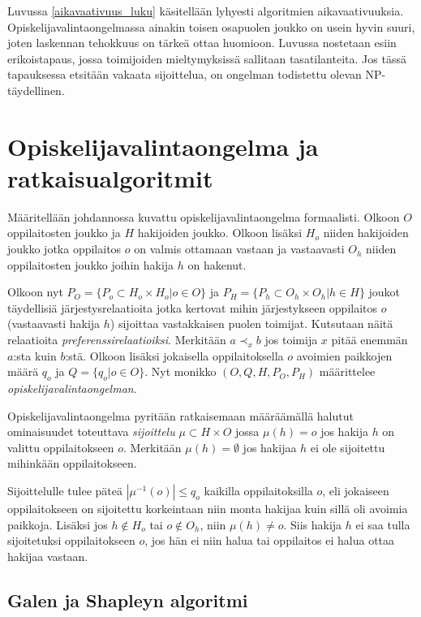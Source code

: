 \documentclass[gradu, twoside]{tktltiki}
\begin{document}
Luvussa \ref{aikavaativuus_luku} käsitellään lyhyesti algoritmien
aikavaativuuksia. Opiskelijavalintaongelmassa ainakin toisen osapuolen
joukko on usein hyvin suuri, joten laskennan tehokkuus on tärkeä ottaa
huomioon. Luvussa nostetaan esiin erikoistapaus, jossa toimijoiden
mieltymyksissä sallitaan tasatilanteita. Jos tässä tapauksessa
etsitään vakaata sijoittelua, on ongelman todistettu olevan
NP-täydellinen.

\section{Opiskelijavalintaongelma ja ratkaisualgoritmit}
\label{algoritmit_luku}

Määritellään johdannossa kuvattu opiskelijavalintaongelma formaalisti.
Olkoon $O$ oppilaitosten joukko ja $H$ hakijoiden joukko. Olkoon
lisäksi $H_o$ niiden hakijoiden joukko jotka oppilaitos $o$ on valmis
ottamaan vastaan ja vastaavasti $O_h$ niiden oppilaitosten joukko
joihin hakija $h$ on hakenut.
\newpage

Olkoon nyt $P_O = \{P_o \subset H_o \times H_o | o \in O\}$ ja $P_H =
\{P_h \subset O_h \times O_h | h \in H\}$ joukot täydellisiä
järjestysrelaatioita jotka kertovat mihin järjestykseen oppilaitos $o$
(vastaavasti hakija $h$) sijoittaa vastakkaisen puolen toimijat.
Kutsutaan näitä relaatioita \emph{preferenssirelaatioiksi}. Merkitään
$a \prec_x b$ jos toimija $x$ pitää enemmän $a$:sta kuin $b$:stä.
Olkoon lisäksi jokaisella oppilaitoksella $o$ avoimien paikkojen määrä
$q_o$ ja $Q = \{q_o | o \in O\}$. Nyt monikko $(O, Q, H, P_O, P_H)$
määrittelee \emph{opiskelijavalintaongelman}.

Opiskelijavalintaongelma pyritään ratkaisemaan määräämällä halutut
ominaisuudet toteuttava \emph{sijoittelu} $\mu \subset H \times O$
jossa $\mu(h) = o$ jos hakija $h$ on valittu oppilaitokseen $o$.
Merkitään $\mu(h) = \emptyset$ jos hakijaa $h$ ei ole sijoitettu
mihinkään oppilaitokseen.

Sijoittelulle tulee päteä $|\mu^{-1}(o)| \leq q_o$ kaikilla
oppilaitoksilla $o$, eli jokaiseen oppilaitokseen on sijoitettu
korkeintaan niin monta hakijaa kuin sillä oli avoimia paikkoja.
Lisäksi jos $h \notin H_o$ tai $o \notin O_h$, niin $\mu(h) \neq o$.
Siis hakija $h$ ei saa tulla sijoitetuksi oppilaitokseen $o$, jos hän
ei niin halua tai oppilaitos ei halua ottaa hakijaa vastaan.

\subsection{Galen ja Shapleyn algoritmi}
\end{document}
